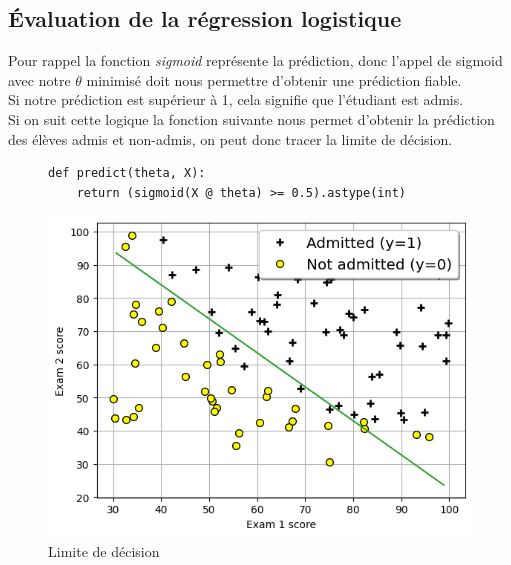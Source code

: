 \subsection{Évaluation de la régression logistique}

Pour rappel la fonction \textit{sigmoid} représente la prédiction, donc l'appel de sigmoid avec notre $\theta$ minimisé doit nous permettre d'obtenir une prédiction fiable.  \\
Si notre prédiction est supérieur à 1, cela signifie que l'étudiant est admis. \\
Si on suit cette logique la fonction suivante nous permet d'obtenir la prédiction des élèves admis et non-admis, on peut donc tracer la limite de décision.


\begin{figure}[!h]
    \begin{minipage}{.40\linewidth}
\begin{verbatim}
def predict(theta, X):
    return (sigmoid(X @ theta) >= 0.5).astype(int)
\end{verbatim}   
    \end{minipage}\hfill
    \begin{minipage}{.56\linewidth}
        \begin{center}
            \includegraphics[width=1\textwidth]{./img/3.2.png}
            \caption{\label{fig:3.2}Limite de décision}  
        \end{center}
    \end{minipage}
\end{figure}
